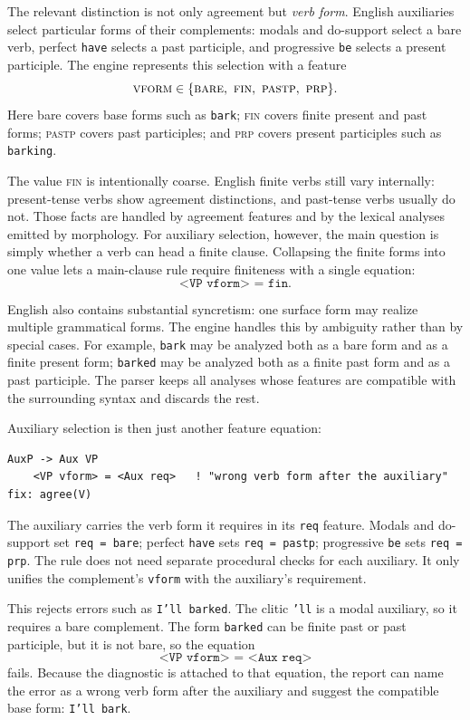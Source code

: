 \documentclass[11pt]{article}
\theoremstyle{definition}
\theoremstyle{plain}
\theoremstyle{remark}
\begin{document}
The relevant distinction is not only agreement but \emph{verb form}. English
auxiliaries select particular forms of their complements: modals and do-support
select a bare verb, perfect \texttt{have} selects a past participle, and
progressive \texttt{be} selects a present participle. The engine represents this
selection with a feature
\[
  \textsc{vform} \in
  \{\textsc{bare},\ \textsc{fin},\ \textsc{pastp},\ \textsc{prp}\}.
\]
Here \textsf{bare} covers base forms such as \texttt{bark}; \textsc{fin} covers
finite present and past forms; \textsc{pastp} covers past participles; and
\textsc{prp} covers present participles such as \texttt{barking}.

The value \textsc{fin} is intentionally coarse. English finite verbs still vary
internally: present-tense verbs show agreement distinctions, and past-tense
verbs usually do not. Those facts are handled by agreement features and by the
lexical analyses emitted by morphology. For auxiliary selection, however, the
main question is simply whether a verb can head a finite clause. Collapsing the
finite forms into one value lets a main-clause rule require finiteness with a
single equation:
\[
  \texttt{<VP vform> = fin}.
\]

English also contains substantial syncretism: one surface form may realize
multiple grammatical forms. The engine handles this by ambiguity rather than by
special cases. For example, \texttt{bark} may be analyzed both as a bare form and
as a finite present form; \texttt{barked} may be analyzed both as a finite past
form and as a past participle. The parser keeps all analyses whose features are
compatible with the surrounding syntax and discards the rest.

Auxiliary selection is then just another feature equation:

\begin{lstlisting}[language=gram]
AuxP -> Aux VP
    <VP vform> = <Aux req>   ! "wrong verb form after the auxiliary" fix: agree(V)
\end{lstlisting}

The auxiliary carries the verb form it requires in its \texttt{req} feature.
Modals and do-support set \texttt{req = bare}; perfect \texttt{have} sets
\texttt{req = pastp}; progressive \texttt{be} sets \texttt{req = prp}. The rule
does not need separate procedural checks for each auxiliary. It only unifies the
complement's \texttt{vform} with the auxiliary's requirement.

This rejects errors such as \texttt{I'll barked}. The clitic \texttt{'ll} is a
modal auxiliary, so it requires a bare complement. The form \texttt{barked} can
be finite past or past participle, but it is not bare, so the equation
\[
  \texttt{<VP vform> = <Aux req>}
\]
fails. Because the diagnostic is attached to that equation, the report can name
the error as a wrong verb form after the auxiliary and suggest the compatible
base form: \texttt{I'll bark}.
\end{document}
